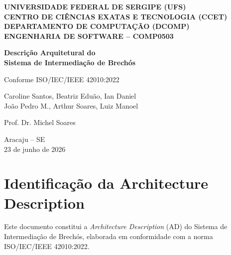 \documentclass[12pt, a4paper]{article}
\begin{document}
\begin{titlepage}
\centering

\textbf{UNIVERSIDADE FEDERAL DE SERGIPE (UFS)}\\
\textbf{CENTRO DE CIÊNCIAS EXATAS E TECNOLOGIA (CCET)}\\
\textbf{DEPARTAMENTO DE COMPUTAÇÃO (DCOMP)}\\
\textbf{ENGENHARIA DE SOFTWARE -- COMP0503}\\

\vspace{3cm}

{\LARGE \textbf{Descrição Arquitetural do\\Sistema de Intermediação de Brechós}}\\

\vspace{1cm}

{\large Conforme ISO/IEC/IEEE 42010:2022}\\

\vspace{3cm}

Caroline Santos, Beatriz Eduão, Ian Daniel\\
João Pedro M., Arthur Soares, Luiz Manoel\\

\vspace{2cm}

Prof. Dr. Michel Soares\\

\vfill

Aracaju -- SE\\
23 de junho de 2026

\end{titlepage}

\newpage

\tableofcontents
\newpage

\section{Identificação da Architecture Description}

Este documento constitui a \textit{Architecture Description} (AD) do Sistema de Intermediação de Brechós, elaborada em conformidade com a norma ISO/IEC/IEEE 42010:2022.
\end{document}
